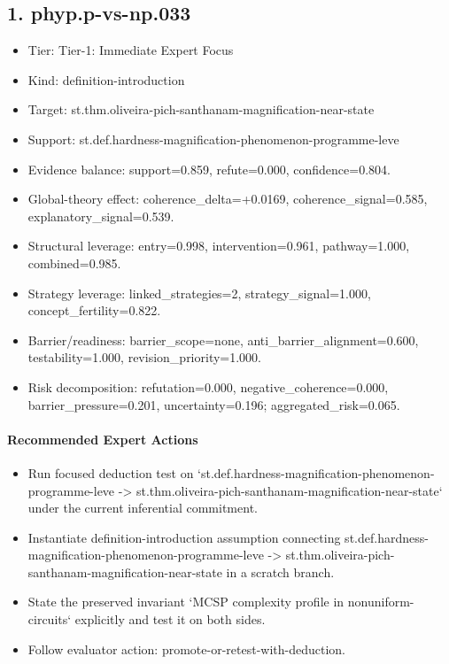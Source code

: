 \documentclass[11pt]{article}
\begin{document}
\subsection*{1. phyp.p-vs-np.033}
\begin{itemize}
\item Tier: Tier-1: Immediate Expert Focus
\item Kind: definition-introduction
\item Target: st.thm.oliveira-pich-santhanam-magnification-near-state
\item Support: st.def.hardness-magnification-phenomenon-programme-leve
\item Evidence balance: support=0.859, refute=0.000, confidence=0.804.
\item Global-theory effect: coherence\_delta=+0.0169, coherence\_signal=0.585, explanatory\_signal=0.539.
\item Structural leverage: entry=0.998, intervention=0.961, pathway=1.000, combined=0.985.
\item Strategy leverage: linked\_strategies=2, strategy\_signal=1.000, concept\_fertility=0.822.
\item Barrier/readiness: barrier\_scope=none, anti\_barrier\_alignment=0.600, testability=1.000, revision\_priority=1.000.
\item Risk decomposition: refutation=0.000, negative\_coherence=0.000, barrier\_pressure=0.201, uncertainty=0.196; aggregated\_risk=0.065.
\end{itemize}
\paragraph{Recommended Expert Actions}
\begin{itemize}
\item Run focused deduction test on `st.def.hardness-magnification-phenomenon-programme-leve -> st.thm.oliveira-pich-santhanam-magnification-near-state` under the current inferential commitment.
\item Instantiate definition-introduction assumption connecting st.def.hardness-magnification-phenomenon-programme-leve -> st.thm.oliveira-pich-santhanam-magnification-near-state in a scratch branch.
\item State the preserved invariant `MCSP complexity profile in nonuniform-circuits` explicitly and test it on both sides.
\item Follow evaluator action: promote-or-retest-with-deduction.
\end{itemize}
\end{document}
